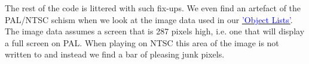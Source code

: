 The rest of the code is littered with such fix-ups. We even find an artefact of the PAL/NTSC
schism when we look at the image data used in our 
\hyperref[sec:object_lists]{\textcolor{blue}{'Object Lists'}}.
The image data assumes a screen that is 287 pixels high, i.e. one that will display a full 
screen on PAL. When playing on NTSC this area of the image is not written to and instead we
find a bar of pleasing junk pixels. 
\begin{figure}[H]
  {
    \setlength{\tabcolsep}{3.0pt}
    \setlength\cmidrulewidth{\heavyrulewidth} %
    }
\end{figure}
